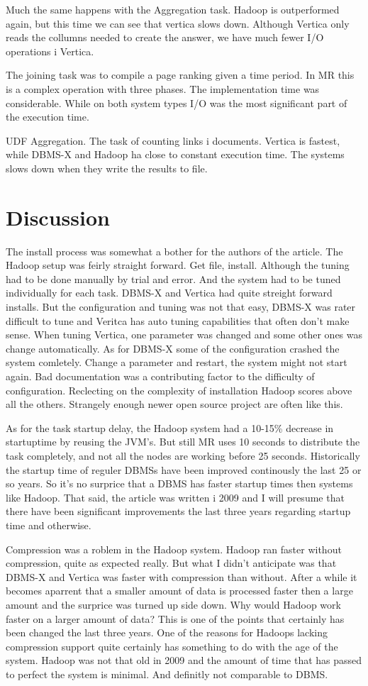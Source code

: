 \documentclass[11pt, a4paper]{article}
\begin{document}
Much the same happens with the Aggregation task. Hadoop is outperformed again, but this time we can see that vertica slows down. 
Although Vertica only reads the collumns needed to create the answer, we have much fewer I/O operations i Vertica. 

The joining task was to compile a page ranking given a time period. In MR this is a complex operation with three phases. The implementation time was considerable. While on both system types I/O was the most significant part of the execution time. 

UDF Aggregation. The task of counting links i documents. Vertica is fastest, while DBMS-X and Hadoop ha close to constant execution time. 
The systems slows down when they write the results to file. 

\section{Discussion}
The install process was somewhat a bother for the authors of the article. The Hadoop setup was feirly straight forward. Get file, install.
Although the tuning had to be done manually by trial and error. And the system had to be tuned individually for each task. 
DBMS-X and Vertica had quite streight forward installs. But the configuration and tuning was not that easy, DBMS-X was rater difficult to tune and Veritca has auto tuning capabilities that often don't make sense. When tuning Vertica, one parameter was changed and some other ones was change automatically. 
As for DBMS-X some of the configuration crashed the system comletely. Change a parameter and restart, the system might not start again. Bad documentation was a contributing factor to the difficulty of configuration. 
Reclecting on the complexity of installation Hadoop scores above all the others. Strangely enough newer open source project are often like this. 

As for the task startup delay, the Hadoop system had a 10-15\% decrease in startuptime by reusing the JVM's. But still MR uses 10 seconds to distribute the task completely, and not all the nodes are working before 25 seconds. 
Historically the startup time of reguler DBMSs have been improved continously the last 25 or so years. So it's no surprice that a DBMS has faster startup times then systems like Hadoop. 
That said, the article was written i 2009 and I will presume that there have been significant improvements the last three years regarding startup time and otherwise. 

Compression was a roblem in the Hadoop system. Hadoop ran faster without compression, quite as expected really. But what I didn't anticipate was that DBMS-X and Vertica was faster with compression than without. After a while it becomes aparrent that a smaller amount of data is processed faster then a large amount and the surprice was turned up side down. Why would Hadoop work faster on a larger amount of data?
This is one of the points that certainly has been changed the last three years. 
One of the reasons for Hadoops lacking compression support quite certainly has something to do with the age of the system. Hadoop was not that old in 2009 and the amount of time that has passed to perfect the system is minimal. And definitly not comparable to DBMS. 
\end{document}
